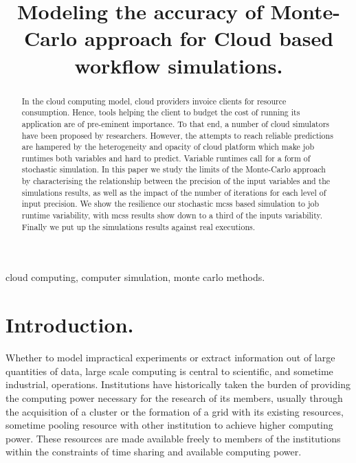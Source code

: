 \documentclass[10pt,conference,compsocconf]{IEEEtran}
\title{Modeling the accuracy of Monte-Carlo approach for Cloud based workflow simulations.}
\author{\IEEEauthorblockN{Luke~Bertot 
			and Stéphane~Genaud 
			and Julien~Gossa}
	\IEEEauthorblockA{Icube-ICPS --- UMR 7357, Univeristé de Strasbourg, CNRS\\
		P\^ole API Blvd S. Bant, 67400 Illkirch\\
		email: \url{lbertot@unistra.fr}, \url{genaud@unistra.fr}, \url{gossa@unistra.fr}}
	}
\begin{document}
\maketitle

\begin{abstract}
  In the  cloud computing  model, cloud providers  invoice clients  for resource
  consumption. Hence, tools helping the client to budget the cost of running its
  application are  of pre-eminent  importance. To  that end,  a number  of cloud
  simulators have been  proposed by researchers. However, the  attempts to reach
  reliable predictions  are hampered by  the heterogeneity and opacity  of cloud
  platform which make job runtimes both  variables and hard to predict. Variable
  runtimes call for a form of stochastic simulation.
  In this paper we study  the limits of the Monte-Carlo approach by
  characterising the relationship  between the precision of  the input variables
  and the simulations results, as well as the impact of the number of iterations
  for each level of input precision. We show the resilience our stochastic
  \aclp{mcs} based simulation to job runtime variability, with \aclp{mcs}
  results show down to a third of the inputs variability. Finally we put up the
  simulations results against real executions.
\end{abstract}

\begin{IEEEkeywords}
cloud computing, computer simulation, monte carlo methods.
\end{IEEEkeywords}

\section{Introduction.}

Whether to  model impractical  experiments or extract  information out  of large
quantities of data, large scale computing is central to scientific, and sometime
industrial,  operations.  Institutions  have  historically taken  the burden  of
providing the computing power necessary for the research of its members, usually
through  the acquisition  of a  cluster  or the  formation  of a  grid with  its
existing resources, sometime pooling resource  with other institution to achieve
higher computing power.  These resources are made available freely to members of
the institutions within the constraints  of time sharing and available computing
power.
\end{document}
